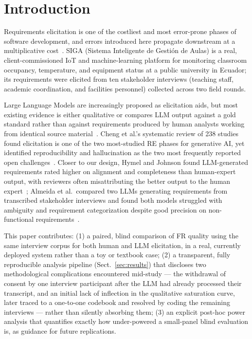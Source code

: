 \documentclass{llncs}
\begin{document}
\section{Introduction}

Requirements elicitation is one of the costliest and most error-prone phases of
software development, and errors introduced here propagate downstream at a
multiplicative cost~\cite{sommerville2015software}. SIGA (Sistema Inteligente de
Gesti\'on de Aulas) is a real, client-commissioned IoT and machine-learning platform for
monitoring classroom occupancy, temperature, and equipment status at a public
university in Ecuador; its requirements were elicited from ten stakeholder interviews
(teaching staff, academic coordination, and facilities personnel) collected across two
field rounds.

Large Language Models are increasingly proposed as elicitation aids, but most existing
evidence is either qualitative or compares LLM output against a gold standard rather
than against requirements produced by human analysts working from identical source
material~\cite{cheng2026genai,arora2024advancing}. Cheng et al.'s systematic review of
238 studies found elicitation is one of the two most-studied RE phases for generative
AI, yet identified reproducibility and hallucination as the two most frequently reported
open challenges~\cite{cheng2026genai}. Closer to our design, Hymel and Johnson found
LLM-generated requirements rated higher on alignment and completeness than
human-expert output, with reviewers often misattributing the better output to the human
expert~\cite{hymel2025analysis}; Almeida et al.\ compared two LLMs generating
requirements from transcribed stakeholder interviews and found both models struggled
with ambiguity and requirement categorization despite good precision on non-functional
requirements~\cite{almeida2025elicitation}.

This paper contributes: (1) a paired, blind comparison of FR quality using the same
interview corpus for both human and LLM elicitation, in a real, currently deployed
system rather than a toy or textbook case; (2) a transparent, fully reproducible
analysis pipeline (Sect.~\ref{sec:results}) that discloses two methodological
complications encountered mid-study --- the withdrawal of consent by one interview
participant after the LLM had already processed their transcript, and an initial lack of
inflection in the qualitative saturation curve, later traced to a one-to-one codebook and
resolved by coding the remaining interviews --- rather than silently absorbing them; (3) an explicit post-hoc power analysis that quantifies
exactly how under-powered a small-panel blind evaluation is, as guidance for future
replications.
\end{document}
